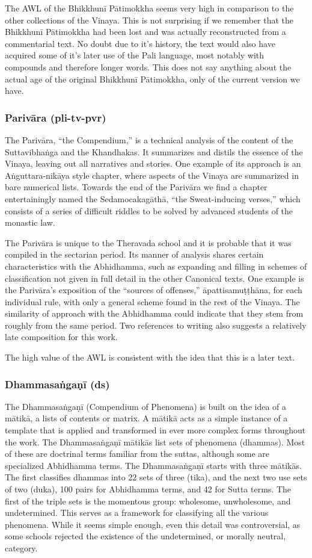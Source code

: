 The AWL of the Bhikkhunī Pātimokkha seems very high in comparison to the other collections of the Vinaya. This is not surprising if we remember that the Bhikkhunī Pātimokkha had been lost and was actually reconstructed from a commentarial text. No doubt due to it's history, the text would also have acquired some of it's later use of the Pali language, most notably with compounds and therefore longer words. This does not say anything about the actual age of the original Bhikkhunī Pātimokkha, only of the current version we have.

\subsubsection{Parivāra (pli-tv-pvr)}
The Parivāra, “the Compendium,” is a technical analysis of the content of the Suttavibhaṅga and the Khandhakas. It summarizes and distils the essence of the Vinaya, leaving out all narratives and stories. One example of its approach is an Aṅguttara-nikāya style chapter, where aspects of the Vinaya are summarized in bare numerical lists. Towards the end of the Parivāra we find a chapter entertainingly named the Sedamocakagāthā, “the Sweat-inducing verses,” which consists of a series of difficult riddles to be solved by advanced students of the monastic law.

The Parivāra is unique to the Theravada school and it is probable that it was compiled in the sectarian period. Its manner of analysis shares certain characteristics with the Abhidhamma, such as expanding and filling in schemes of classification not given in full detail in the other Canonical texts. One example is the Parivāra’s exposition of the “sources of offenses,” āpattisamuṭṭhāna, for each individual rule, with only a general scheme found in the rest of the Vinaya. The similarity of approach with the Abhidhamma could indicate that they stem from roughly from the same period. Two references to writing also suggests a relatively late composition for this work.

The high value of the AWL is consistent with the idea that this is a later text. 

\subsubsection{Dhammasaṅgaṇī (ds)}
The Dhammasaṅgaṇī (Compendium of Phenomena) is built on the idea of a mātikā, a lists of contents or matrix. A mātikā acts as a simple instance of a template that is applied and transformed in ever more complex forms throughout the work. The Dhammasaṅgaṇī mātikās list sets of phenomena (dhammas). Most of these are doctrinal terms familiar from the suttas, although some are specialized Abhidhamma terms. The Dhammasaṅgaṇī starts with three mātikās. The first classifies dhammas into 22 sets of three (tika), and the next two use sets of two (duka), 100 pairs for Abhidhamma terms, and 42 for Sutta terms. The first of the triple sets is the momentous group: wholesome, unwholesome, and undetermined. This serves as a framework for classifying all the various phenomena. While it seems simple enough, even this detail was controversial, as some schools rejected the existence of the undetermined, or morally neutral, category.

